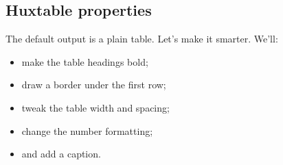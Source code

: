 \documentclass[]{article}
\newenvironment{Shaded}{\begin{snugshade}}{\end{snugshade}}
\newcommand{\DecValTok}[1]{\textcolor[rgb]{0.00,0.00,0.81}{#1}}
\newcommand{\FloatTok}[1]{\textcolor[rgb]{0.00,0.00,0.81}{#1}}
\newcommand{\KeywordTok}[1]{\textcolor[rgb]{0.13,0.29,0.53}{\textbf{#1}}}
\newcommand{\NormalTok}[1]{#1}
\newcommand{\OperatorTok}[1]{\textcolor[rgb]{0.81,0.36,0.00}{\textbf{#1}}}
\newcommand{\StringTok}[1]{\textcolor[rgb]{0.31,0.60,0.02}{#1}}
\providecommand{\tightlist}{%
  \setlength{\itemsep}{0pt}\setlength{\parskip}{0pt}}
\begin{document}
\FloatBarrier

\hypertarget{huxtable-properties}{%
\subsection{Huxtable properties}\label{huxtable-properties}}

The default output is a plain table. Let's make it smarter. We'll:

\begin{itemize}
\tightlist
\item
  make the table headings bold;
\item
  draw a border under the first row;
\item
  tweak the table width and spacing;
\item
  change the number formatting;
\item
  and add a caption.
\end{itemize}

\begin{Shaded}
\end{Shaded}

 
  \providecommand{\huxb}[2]{\arrayrulecolor[RGB]{#1}\global\arrayrulewidth=#2pt}
  \providecommand{\huxvb}[2]{\color[RGB]{#1}\vrule width #2pt}
  \providecommand{\huxtpad}[1]{\rule{0pt}{#1}}
  \providecommand{\huxbpad}[1]{\rule[-#1]{0pt}{#1}}
\end{document}
